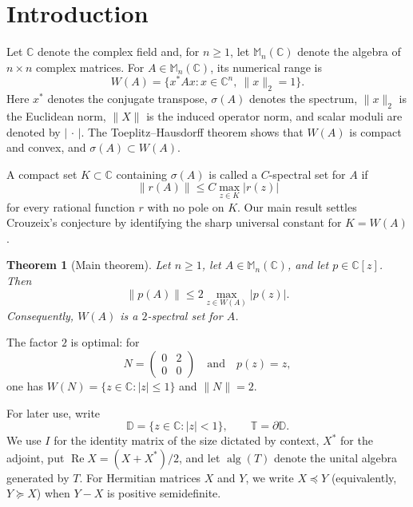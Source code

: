 \documentclass[preprints,article,submit,oneauthor]{Definitions/mdpi}
\newcounter{manuscriptresult}[section]
\theoremstyle{mdpi}
\newtheorem{theorem}[manuscriptresult]{Theorem}
\theoremstyle{definition}
\newcommand{\C}{\mathbb C}
\newcommand{\D}{\mathbb D}
\newcommand{\Torus}{\mathbb T}
\newcommand{\Mn}{\mathbb M_n(\C)}
\newcommand{\alg}{\operatorname{alg}}
\newcommand{\RePart}{\operatorname{Re}}
\begin{document}
\section{Introduction}
\label{sec:introduction}

Let $\C$ denote the complex field and, for $n\geq1$, let $\Mn$ denote
the algebra of $n\times n$ complex matrices.  For $A\in\Mn$, its
numerical range is
\begin{equation}
  W(A)=\{x^*Ax:x\in\C^n,\ \lVert x\rVert_2=1\}.
  \label{eq:numerical-range}
\end{equation}
Here $x^*$ denotes the conjugate transpose, $\sigma(A)$ denotes the
spectrum, $\lVert x\rVert_2$ is the Euclidean norm, $\lVert X\rVert$ is
the induced operator norm, and scalar moduli are denoted by
$\lvert\,\cdot\,\rvert$.  The Toeplitz--Hausdorff theorem shows that
$W(A)$ is compact and convex, and $\sigma(A)\subset W(A)$.

A compact set $K\subset\C$ containing $\sigma(A)$ is called a
$C$-spectral set for $A$ if
\begin{equation}
  \lVert r(A)\rVert\leq C\max_{z\in K}\lvert r(z)\rvert
  \label{eq:spectral-set-definition}
\end{equation}
for every rational function $r$ with no pole on $K$.  Our main result
settles Crouzeix's conjecture by identifying the sharp universal
constant for $K=W(A)$.

\begin{theorem}[Main theorem]
\label{thm:main}
Let $n\geq1$, let $A\in\Mn$, and let $p\in\C[z]$.  Then
\begin{equation}
  \lVert p(A)\rVert
  \leq2\max_{z\in W(A)}\lvert p(z)\rvert.
  \label{eq:main-bound}
\end{equation}
Consequently, $W(A)$ is a $2$-spectral set for $A$.
\end{theorem}

The factor $2$ is optimal: for
\begin{equation}
  N=\begin{pmatrix}0&2\\0&0\end{pmatrix}
  \quad\text{and}\quad p(z)=z,
  \label{eq:sharp-example}
\end{equation}
one has $W(N)=\{z\in\C:\lvert z\rvert\leq1\}$ and
$\lVert N\rVert=2$.

For later use, write
\[
  \D=\{z\in\C:\lvert z\rvert<1\},
  \qquad
  \Torus=\partial\D.
\]
We use $I$ for the identity matrix of the size dictated by context,
$X^*$ for the adjoint, put $\RePart X=(X+X^*)/2$, and let $\alg(T)$
denote the unital algebra generated by $T$.  For Hermitian matrices
$X$ and $Y$, we write $X\preceq Y$ (equivalently, $Y\succeq X$) when
$Y-X$ is positive semidefinite.
\end{document}

